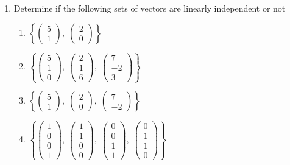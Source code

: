 \documentclass[12pt]{article}
\numberwithin{equation}{subsection}
\numberwithin{figure}{subsection}
\theoremstyle{note}
\begin{document}
\begin{enumerate}[label=\arabic*.]
	\item Determine if the following sets of vectors are linearly independent or not
	\begin{enumerate}
		\item$\left\{  
			\begin{pmatrix} 5 \\ 1\end{pmatrix}, \;
			\begin{pmatrix} 2 \\ 0 \end{pmatrix} 
		\right\}$
		\item $\left\{  
			\begin{pmatrix} 5 \\ 1 \\ 0 \end{pmatrix}, \;
			\begin{pmatrix} 2 \\ 1 \\ 6 \end{pmatrix}, \;
			\begin{pmatrix} 7 \\ -2 \\ 3 \end{pmatrix}
		\right\}$
		\item $\left\{  
			\begin{pmatrix} 5 \\ 1\end{pmatrix}, \;
			\begin{pmatrix} 2 \\ 0 \end{pmatrix}, \;
			\begin{pmatrix} 7 \\ -2 \end{pmatrix}
		\right\}$
		\item $\left\{  
			\begin{pmatrix} 1 \\ 0 \\ 0 \\ 1\end{pmatrix}, \;
			\begin{pmatrix} 1 \\ 1 \\ 0 \\ 0 \end{pmatrix}, \;
			\begin{pmatrix} 0 \\ 0 \\ 1 \\ 1 \end{pmatrix}, \;
			\begin{pmatrix} 0 \\ 1 \\ 1 \\ 0 \end{pmatrix}
		\right\}$
	\end{enumerate}
	

\end{enumerate}
\end{document}
